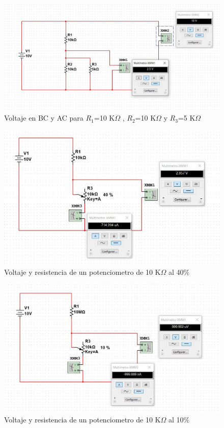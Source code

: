 \documentclass[twoside,twocolumn]{article}
\begin{document}
\begin{itemize}
    \begin{figure}[h]
    \centering
    \includegraphics[scale=0.28]{imagenes1/2.2.JPG}
    \caption{Voltaje en BC y AC para $R_{1}$=10 K$\Omega$ , $R_{2}$=10 K$\Omega$ y $R_{3}$=5 K$\Omega$}
    \label{fig:circuito2}
    \end{figure}
    
    \begin{figure}[h]
    \centering
    \includegraphics[scale=0.3]{imagenes1/2.4.JPG}
    \caption{Voltaje y resistencia de un potenciometro de 10 K$\Omega$ al 40\%}
    \label{fig:circuito3}
    \end{figure}
\newpage        
    \begin{figure}[h]
    \centering
    \includegraphics[scale=0.28]{imagenes1/2.5.JPG}
    \caption{Voltaje y resistencia de un potenciometro de 10 K$\Omega$ al 10\%}
    \label{fig:circuito4}
    \end{figure}


\end{itemize}
\end{document}

